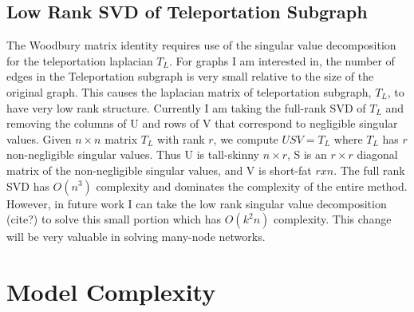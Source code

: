 \documentclass{article}
\begin{document}
\subsection{Low Rank SVD of Teleportation Subgraph}
The Woodbury matrix identity requires use of the singular value decomposition for the teleportation laplacian $T_L$. For graphs I am interested in, the number of edges in the Teleportation subgraph is very small relative to the size of the original graph. This causes the laplacian matrix of teleportation subgraph, $T_L$, to have very low rank structure. Currently I am taking the full-rank SVD of $T_L$ and removing the columns of U and rows of V that correspond to negligible singular values. Given $n\times n$ matrix $T_L$ with rank $r$, we compute $USV = T_L$ where $T_L$ has $r$ non-negligible singular values. Thus U is tall-skinny $n\times r$, S is an $r\times r$ diagonal matrix of the non-negligible singular values, and V is short-fat $rxn$. The full rank SVD has $O(n^3)$ complexity and dominates the complexity of the entire method. However, in future work I can take the low rank singular value decomposition (cite?) to solve this small portion which has $O(k^2 n)$ complexity. This change will be very valuable in solving many-node networks.

\section{Model Complexity}
\end{document}

